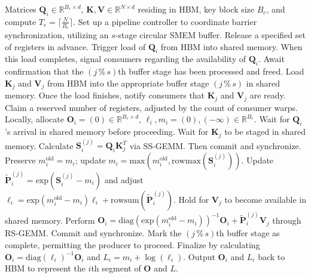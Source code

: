 \begin{enumerate}
\begin{algorithm}[H]
    \caption{\small\label{alg:flash3_wgmma_ws_only}\textsc{FlashAttention-3} forward pass \textbf{without} intra-consumer overlapping -- CTA perspective}
    \begin{algorithmic}[1]
\REQUIRE Matrices $\mathbf{Q}_i \in \mathbb{R}^{B_r \times d}$, $\mathbf{K}, \mathbf{V} \in \mathbb{R}^{N \times d}$ residing in HBM, key block size $B_c$, and compute $T_c = \lceil \frac{N}{B_c} \rceil$.
\STATE Set up a pipeline controller to coordinate barrier synchronization, utilizing an $s$-stage circular SMEM buffer.
\STATE Release a specified set of registers in advance.
\STATE Trigger load of $\mathbf{Q}_i$ from HBM into shared memory.
\STATE When this load completes, signal consumers regarding the availability of $\mathbf{Q}_i$.
    \STATE Await confirmation that the $(j\,\%\,s)$th buffer stage has been processed and freed.
    \STATE Load $\mathbf{K}_j$ and $\mathbf{V}_j$ from HBM into the appropriate buffer stage $(j\,\%\,s)$ in shared memory.
    \STATE Once the load finishes, notify consumers that $\mathbf{K}_j$ and $\mathbf{V}_j$ are ready.
\ENDFOR
\ELSE \STATE Claim a reserved number of registers, adjusted by the count of consumer warps.
\STATE Locally, allocate $\mathbf{O}_i = (0) \in \mathbb{R}^{B_r \times d}$, $\ell_i, m_i = (0), (-\infty) \in \mathbb{R}^{B_r}$.
\STATE Wait for $\mathbf{Q}_i$'s arrival in shared memory before proceeding.
\STATE Wait for $\mathbf{K}_j$ to be staged in shared memory.
\STATE Calculate $\mathbf{S}_i^{(j)} = \mathbf{Q}_i \mathbf{K}_j^T$ via SS-GEMM. Then commit and synchronize. \label{alg:ws_only_gemm1}
\STATE Preserve $m_i^{\mathrm{old}} = m_i$; update $m_i = \mathrm{max}(m_i^{\mathrm{old}}, \mathrm{rowmax}(\mathbf{S}_i^{(j)}))$. \label{code-ws:softmax_start}
\STATE Update $\widetilde{\mathbf{P}}_i^{(j)} = \mathrm{exp}(\mathbf{S}_i^{(j)} - m_i)$ and adjust $\ell_i = \mathrm{exp}(m_i^{\mathrm{old}} - m_i) \ell_i + \mathrm{rowsum}(\widetilde{\mathbf{P}}_i^{(j)})$. \label{code-ws:softmax_end}
\STATE Hold for $\mathbf{V}_j$ to become available in shared memory.
\STATE Perform $\mathbf{O}_i = \mathrm{diag}(\mathrm{exp}(m_i^{\mathrm{old}} - m_i))^{-1} \mathbf{O}_i + \widetilde{\mathbf{P}}_i^{(j)} \mathbf{V}_j$ through RS-GEMM. Commit and synchronize. \label{alg:ws_only_gemm2}
\STATE Mark the $(j\,\%\,s)$th buffer stage as complete, permitting the producer to proceed.
\ENDFOR
\STATE Finalize by calculating $\mathbf{O}_i = \mathrm{diag}(\ell_i)^{-1} \mathbf{O}_i$ and $L_i = m_i + \log(\ell_i)$.
\STATE Output $\mathbf{O}_i$ and $L_i$ back to HBM to represent the $i$th segment of $\mathbf{O}$ and $L$.
\ENDIF
\end{algorithmic}
\end{algorithm}


\end{enumerate}
